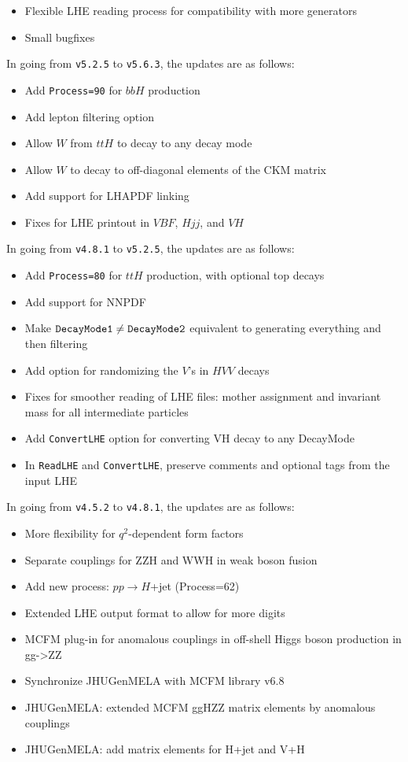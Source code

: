 \documentclass[aps,superscriptaddress,nofootinbib]{revtex4}
\begin{document}
\begin{itemize}
\item Flexible LHE reading process for compatibility with more generators
\item Small bugfixes
\end{itemize}

\noindent
In going from \verb|v5.2.5| to \verb|v5.6.3|, the updates are as follows:

\begin{itemize}
\item Add \verb|Process=90| for $bbH$ production
\item Add lepton filtering option
\item Allow $W$ from $ttH$ to decay to any decay mode
\item Allow $W$ to decay to off-diagonal elements of the CKM matrix
\item Add support for LHAPDF linking
\item Fixes for LHE printout in $VBF$, $Hjj$, and $VH$
\end{itemize}

\noindent
In going from \verb|v4.8.1| to \verb|v5.2.5|, the updates are as follows:

\begin{itemize}
\item Add \verb|Process=80| for $ttH$ production, with optional top decays
\item Add support for NNPDF
\item Make $\verb|DecayMode1|\ne\verb|DecayMode2|$ equivalent to generating everything and then filtering
\item Add option for randomizing the $V$'s in $HVV$ decays
\item Fixes for smoother reading of LHE files: mother assignment and invariant mass for all intermediate particles
\item Add \verb|ConvertLHE| option for converting VH decay to any DecayMode
\item In \verb|ReadLHE| and \verb|ConvertLHE|, preserve comments and optional tags from the input LHE
\end{itemize}

\noindent
In going from \verb|v4.5.2| to \verb|v4.8.1|, the updates are as follows:

\begin{itemize}
\item More flexibility for $q^2$-dependent form factors
\item Separate couplings for ZZH and WWH in weak boson fusion
\item Add new process: $pp\to H$+jet (Process=62)
\item Extended LHE output format to allow for more digits
\item MCFM plug-in for anomalous couplings in off-shell Higgs boson production in gg->ZZ
\item Synchronize JHUGenMELA with MCFM library v6.8
\item JHUGenMELA: extended MCFM ggHZZ matrix elements by anomalous couplings
\item JHUGenMELA: add matrix elements for H+jet and V+H
\end{itemize}
\end{document}
